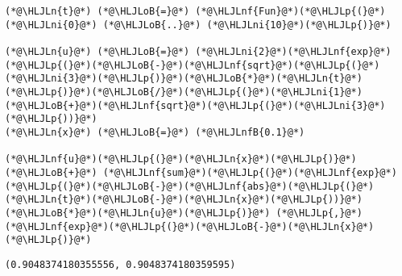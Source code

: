 \documentclass[12pt,a4paper]{article}
\newcommand{\HLJLn}[1]{#1}
\newcommand{\HLJLnf}[1]{\textcolor[RGB]{66,102,213}{#1}}
\newcommand{\HLJLnfB}[1]{\textcolor[RGB]{59,151,46}{#1}}
\newcommand{\HLJLni}[1]{\textcolor[RGB]{59,151,46}{#1}}
\newcommand{\HLJLoB}[1]{\textcolor[RGB]{102,102,102}{\textbf{#1}}}
\newcommand{\HLJLp}[1]{#1}
\begin{document}
\begin{lstlisting}
(*@\HLJLn{t}@*) (*@\HLJLoB{=}@*) (*@\HLJLnf{Fun}@*)(*@\HLJLp{(}@*)(*@\HLJLni{0}@*) (*@\HLJLoB{..}@*) (*@\HLJLni{10}@*)(*@\HLJLp{)}@*)

(*@\HLJLn{u}@*) (*@\HLJLoB{=}@*) (*@\HLJLni{2}@*)(*@\HLJLnf{exp}@*)(*@\HLJLp{(}@*)(*@\HLJLoB{-}@*)(*@\HLJLnf{sqrt}@*)(*@\HLJLp{(}@*)(*@\HLJLni{3}@*)(*@\HLJLp{)}@*)(*@\HLJLoB{*}@*)(*@\HLJLn{t}@*)(*@\HLJLp{)}@*)(*@\HLJLoB{/}@*)(*@\HLJLp{(}@*)(*@\HLJLni{1}@*)(*@\HLJLoB{+}@*)(*@\HLJLnf{sqrt}@*)(*@\HLJLp{(}@*)(*@\HLJLni{3}@*)(*@\HLJLp{))}@*)
(*@\HLJLn{x}@*) (*@\HLJLoB{=}@*) (*@\HLJLnfB{0.1}@*)

(*@\HLJLnf{u}@*)(*@\HLJLp{(}@*)(*@\HLJLn{x}@*)(*@\HLJLp{)}@*) (*@\HLJLoB{+}@*) (*@\HLJLnf{sum}@*)(*@\HLJLp{(}@*)(*@\HLJLnf{exp}@*)(*@\HLJLp{(}@*)(*@\HLJLoB{-}@*)(*@\HLJLnf{abs}@*)(*@\HLJLp{(}@*)(*@\HLJLn{t}@*)(*@\HLJLoB{-}@*)(*@\HLJLn{x}@*)(*@\HLJLp{))}@*)(*@\HLJLoB{*}@*)(*@\HLJLn{u}@*)(*@\HLJLp{)}@*) (*@\HLJLp{,}@*) (*@\HLJLnf{exp}@*)(*@\HLJLp{(}@*)(*@\HLJLoB{-}@*)(*@\HLJLn{x}@*)(*@\HLJLp{)}@*)
\end{lstlisting}

\begin{lstlisting}
(0.9048374180355556, 0.9048374180359595)
\end{lstlisting}
\end{document}
